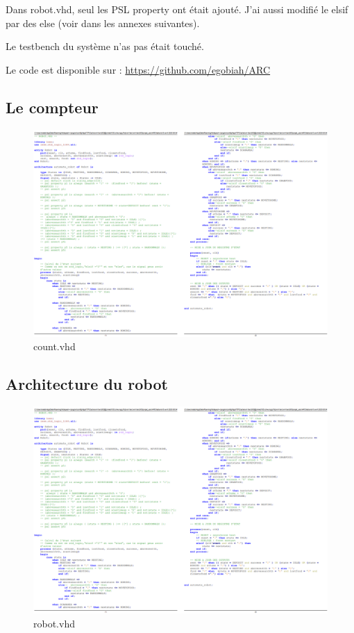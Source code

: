 \documentclass{article}
\newcommand{\sautligne}{
\textbf{\vspace{5mm}}
}
\begin{document}
Dans robot.vhd, seul les PSL property ont était ajouté. J'ai aussi modifié le elsif par des else (voir dans les annexes suivantes).
\sautligne

Le testbench du système n'as pas était touché.
\sautligne

Le code est disponible sur : \url{https://github.com/egobiah/ARC}

\begin{landscape}


\subsection{Le compteur}
\begin{figure}[!h]
\centering
\includegraphics[scale=0.60]{robot.PNG}
\caption{count.vhd}
\end{figure} 

\newpage

\subsection{Architecture du robot}
\begin{figure}[!h]
\centering

\includegraphics[scale=0.60]{robot.PNG}
\caption{robot.vhd}
\end{figure} 


\end{landscape}
\end{document}
